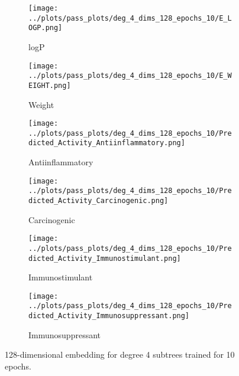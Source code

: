 \begin{figure*}
\centering

\begin{subfigure}{0.45\textwidth}
    \texttt{[image: ../plots/pass\_plots/deg\_4\_dims\_128\_epochs\_10/E\_LOGP.png]}
    \caption{logP}
\end{subfigure}
\begin{subfigure}{0.45\textwidth}
    \texttt{[image: ../plots/pass\_plots/deg\_4\_dims\_128\_epochs\_10/E\_WEIGHT.png]}
    \caption{Weight}
\end{subfigure}
\begin{subfigure}{0.45\textwidth}
    \texttt{[image: ../plots/pass\_plots/deg\_4\_dims\_128\_epochs\_10/Predicted\_Activity\_Antiinflammatory.png]}
    \caption{Antiinflammatory}
\end{subfigure}
\begin{subfigure}{0.45\textwidth}
    \texttt{[image: ../plots/pass\_plots/deg\_4\_dims\_128\_epochs\_10/Predicted\_Activity\_Carcinogenic.png]}
    \caption{Carcinogenic}
\end{subfigure}
\begin{subfigure}{0.45\textwidth}
    \texttt{[image: ../plots/pass\_plots/deg\_4\_dims\_128\_epochs\_10/Predicted\_Activity\_Immunostimulant.png]}
    \caption{Immunostimulant}
\end{subfigure}
\begin{subfigure}{0.45\textwidth}
    \texttt{[image: ../plots/pass\_plots/deg\_4\_dims\_128\_epochs\_10/Predicted\_Activity\_Immunosuppressant.png]}
    \caption{Immunosuppressant}
\end{subfigure}
\caption{128-dimensional embedding for degree 4 subtrees trained for 10 epochs.}
\label{fig:deg_4_dims_128_epochs_10}
\end{figure*}


